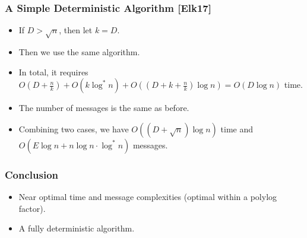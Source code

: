 \begin{frame}
\frametitle{A Simple Deterministic Algorithm [Elk17]}
\begin{itemize}
    \item If $D > \sqrt{n}$, then let $k=D$.
    \item Then we use the same algorithm.
    \item In total, it requires $O(D+\frac{n}{k}) + O(k\log^* n) + O((D + k + \frac{n}{k})\log n) = O(D\log n)$ time.
    \item The number of messages is the same as before.
    \item Combining two cases, we have $O((D + \sqrt{n})\log n)$ time and $O(E \log n + n\log n \cdot \log^* n)$ messages.
\end{itemize}
\end{frame}


\begin{frame}
\frametitle{Conclusion}
\begin{itemize}
    \item Near optimal time and message complexities (optimal within a polylog factor).
    \item A fully deterministic algorithm.
\end{itemize}


\end{frame}
